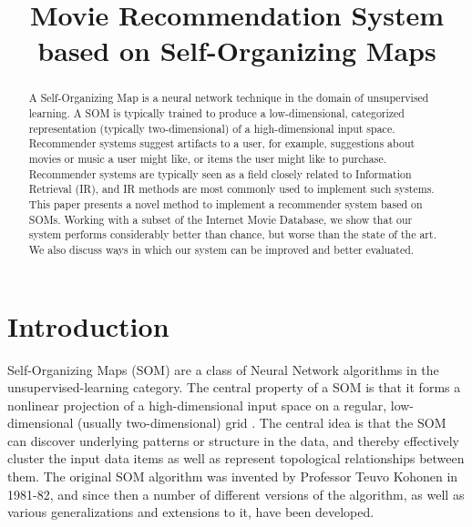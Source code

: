 \documentclass[conference]{IEEEtran}
\begin{document}
%
\title{Movie Recommendation System based on Self-Organizing Maps}


\author{
\and
{}
}


\maketitle


\begin{abstract}
A Self-Organizing Map is a neural network technique in the domain of unsupervised learning. A SOM is typically trained to produce a low-dimensional, categorized representation (typically two-dimensional) of a high-dimensional input space. Recommender systems suggest artifacts to a user, for example, suggestions about movies or music a user might like, or items the user might like to purchase. Recommender systems are typically seen as a field closely related to Information Retrieval (IR), and IR methods are most commonly used to implement such systems. This paper presents a novel method to implement a recommender system based on SOMs. Working with a subset of the Internet Movie Database, we show that our system performs considerably better than chance, but worse than the state of the art. We also discuss ways in which our system can be improved and better evaluated.  
\end{abstract}

\IEEEpeerreviewmaketitle



\section{Introduction}
Self-Organizing Maps (SOM) are a class of Neural Network algorithms in the unsupervised-learning category. The central property of a SOM is that it forms a nonlinear projection of a high-dimensional input space on a regular, low-dimensional (usually two-dimensional) grid \cite{kohonen1995springer}. The central idea is that the SOM can discover underlying patterns or structure in the data, and thereby effectively cluster the input data items as well as represent topological relationships between them. The original SOM algorithm was invented by Professor Teuvo Kohonen in 1981-82, and since then a number of different versions of the algorithm, as well as various generalizations and extensions to it, have been developed.
\end{document}
